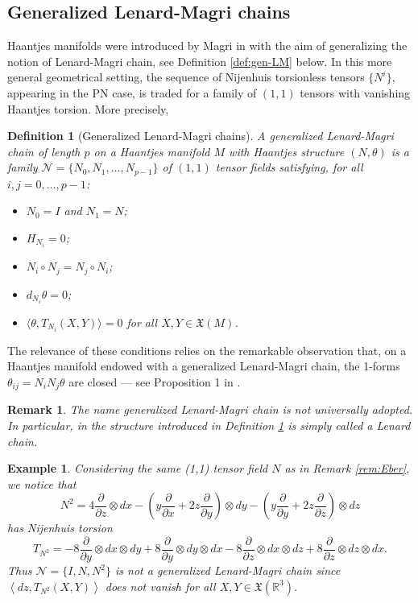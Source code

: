 \documentclass[12pt]{article}
\newtheorem{defi}[theorem]{Definition}
\newtheorem{remark}[theorem]{Remark}
\newtheorem{example}[theorem]{Example}
\begin{document}
\subsection{Generalized Lenard-Magri chains}

Haantjes manifolds were introduced by Magri in \cite{MagriHaa} with the aim of generalizing the notion of Lenard-Magri chain, see Definition \ref{def:gen-LM} below. In this more general geometrical setting, the sequence of Nijenhuis torsionless tensors 
$\{N^i\}%
$, appearing in the PN case, is traded for a family of $(1,1)$ tensors with vanishing Haantjes torsion. More precisely,


\begin{defi}[Generalized Lenard-Magri chains]\label{def:genchain} 
\label{def:gen-LM}
A generalized Lenard-Magri chain of length $p$ on a Haantjes manifold $M$ with Haantjes structure $(N,\theta)$ is a family  
$\mathcal N=\{N_0,N_1,\dots,N_{p-1}\}%
$ of $(1,1)$ tensor fields satisfying, for all $i,j= 0,\dots,p-1$:
\begin{itemize}
\item[(C0)] $N_0=I$ and $N_1=N$;
\item[(C1)] $H_{N_i}=0$; 
\item[(C2)] $N_i\circ N_j=N_j\circ N_i$; 
\item[(C3)] $d_{N_i}\theta=0$; 
\item[(C4)] $\langle\theta,T_{N_i}(X,Y)\rangle=0$ 
for all $X,Y\in\mathfrak X(M)$. 
\end{itemize}
\end{defi}

The relevance of these conditions relies on the remarkable observation that, on a Haantjes manifold endowed with a generalized Lenard-Magri chain, the 1-forms $\theta_{ij}=N_iN_j\theta$ are closed --- see Proposition 1 in \cite{MagriHaa}.

\begin{remark}
The name generalized Lenard-Magri chain is not universally adopted. In particular, in \cite{MagriHaa} the structure introduced in Definition \ref{def:genchain} is simply called a Lenard chain. 
\end{remark} 

\begin{example}
Considering the same (1,1) tensor field $N$ as in Remark \ref{rem:Eber}, we notice that
\[
N^2=4\frac{\partial}{\partial z}\otimes dx-\left(y\frac{\partial}{\partial x}+2z\frac{\partial}{\partial y}\right)\otimes dy-\left(y\frac{\partial}{\partial y}+2z\frac{\partial}{\partial z}\right)\otimes dz
\]
has Nijenhuis torsion
\[
T_{N^2}=-8\frac{\partial}{\partial y}\otimes dx\otimes dy+8\frac{\partial}{\partial y}\otimes dy\otimes dx-8\frac{\partial}{\partial z}\otimes dx\otimes dz+8\frac{\partial}{\partial z}\otimes dz\otimes dx.
\]
Thus $\mathcal N=\{I,N,N^2\}$ is not a generalized Lenard-Magri chain since $\left<dz,T_{N^2}(X,Y)\right>$ does not vanish for all $X,Y\in\mathfrak{X}(\mathbb R^3)$.
\end{example}
\end{document}
